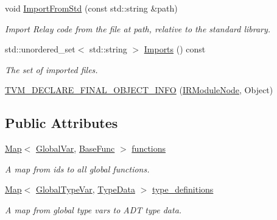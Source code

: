 \begin{DoxyCompactItemize}
void \hyperlink{classtvm_1_1IRModuleNode_ad00716d1699635dafa60bb03741488c0}{Import\+From\+Std} (const std\+::string \&path)
\begin{DoxyCompactList}\small\item\em Import Relay code from the file at path, relative to the standard library. \end{DoxyCompactList}\item 
std\+::unordered\+\_\+set$<$ std\+::string $>$ \hyperlink{classtvm_1_1IRModuleNode_ada72a4ea8d04a3486de5673a1f690fc9}{Imports} () const 
\begin{DoxyCompactList}\small\item\em The set of imported files. \end{DoxyCompactList}\item 
\hyperlink{classtvm_1_1IRModuleNode_a4840f698deaffe0e96317a436dfd079f}{T\+V\+M\+\_\+\+D\+E\+C\+L\+A\+R\+E\+\_\+\+F\+I\+N\+A\+L\+\_\+\+O\+B\+J\+E\+C\+T\+\_\+\+I\+N\+FO} (\hyperlink{classtvm_1_1IRModuleNode}{I\+R\+Module\+Node}, Object)
\end{DoxyCompactItemize}
\subsection*{Public Attributes}
\begin{DoxyCompactItemize}
\item 
\hyperlink{classtvm_1_1Map}{Map}$<$ \hyperlink{classtvm_1_1GlobalVar}{Global\+Var}, \hyperlink{classtvm_1_1BaseFunc}{Base\+Func} $>$ \hyperlink{classtvm_1_1IRModuleNode_a88423026ad43fa60158bc9a647704d93}{functions}
\begin{DoxyCompactList}\small\item\em A map from ids to all global functions. \end{DoxyCompactList}\item 
\hyperlink{classtvm_1_1Map}{Map}$<$ \hyperlink{classtvm_1_1GlobalTypeVar}{Global\+Type\+Var}, \hyperlink{classtvm_1_1TypeData}{Type\+Data} $>$ \hyperlink{classtvm_1_1IRModuleNode_a547dbf39f1ecf5324153e10f7ca724c3}{type\+\_\+definitions}
\begin{DoxyCompactList}\small\item\em A map from global type vars to A\+DT type data. \end{DoxyCompactList}\end{DoxyCompactItemize}
